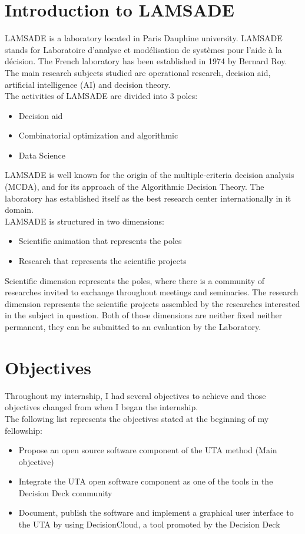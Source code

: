 \documentclass{report}
\begin{document}
\section{Introduction to LAMSADE}
LAMSADE is a laboratory located in Paris Dauphine university. LAMSADE stands for Laboratoire d'analyse et modélisation de systèmes pour l'aide à la décision. The French laboratory has been established in 1974 by Bernard Roy. The main research subjects studied are operational research, decision aid, artificial intelligence (AI) and decision theory. \\
The activities of LAMSADE are divided into 3 poles: 
\begin{itemize}
\item Decision aid 
\item Combinatorial optimization and algorithmic
\item Data Science
\end{itemize}
LAMSADE is well known for the origin of the multiple-criteria decision analysis (MCDA), and for its approach of  the Algorithmic Decision Theory. The laboratory has established itself as the best research center internationally in it domain. \\
LAMSADE is structured in two dimensions:
\begin{itemize}
\item Scientific animation that represents the poles
\item Research that represents the scientific projects 
\end{itemize}
Scientific dimension represents the poles, where there is a community of researches invited to exchange throughout meetings and seminaries. The research dimension represents the scientific projects assembled by the researches interested in the subject in question. Both of those dimensions are neither fixed neither permanent, they can be submitted to an evaluation by the Laboratory. 

\section{Objectives}
Throughout my  internship, I had several objectives to achieve and those objectives changed from when I began the internship. \\
The following list represents the objectives stated at the beginning of my fellowship: 
\begin{itemize}
\item Propose an open source software component of the UTA method (Main objective)
\item Integrate the UTA open software component as one of the tools in the Decision Deck community
\item Document, publish the software and implement a graphical user interface to the UTA by using DecisionCloud, a tool promoted by the Decision Deck
\end{itemize}
\end{document}
